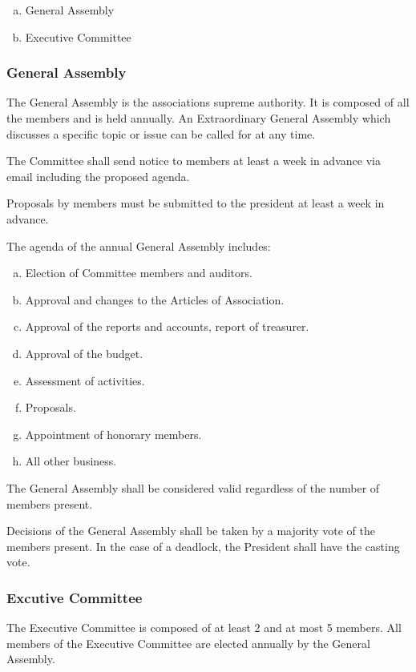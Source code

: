 \documentclass[12pt,a4paper,oneside]{article}
\newcounter{art}
\newcommand{\english}{    \switchcolumn[0]\noindent}
\begin{document}
\begin{paracol}{2}
	\begin{enumerate}[(a)]
	\item General Assembly
	\item Executive Committee
	\end{enumerate}


\english
	\subsubsection{General Assembly}
	The General Assembly is the associations supreme authority. It is composed of all the members and is held annually. An Extraordinary General Assembly which discusses a specific topic or issue can be called for at any time.

	The Committee shall send notice to members at least a week in advance via email including the proposed agenda.

	Proposals by members must be submitted to the president at least a week in advance.

	The agenda of the annual General Assembly includes:
	\begin{enumerate}[(a)]
	\item Election of Committee members and auditors.
	\item Approval and changes to the Articles of Association.
	\item Approval of the reports and accounts, report of treasurer.
	\item Approval of the budget.
	\item Assessment of activities.
	\item Proposals.
	\item Appointment of honorary members.
	\item All other business.
	\end{enumerate}

	The General Assembly shall be considered valid regardless of the number of members present.

	Decisions of the General Assembly shall be taken by a majority vote of the members present. In the case of a deadlock, the President shall have the casting vote.

	
\english
	\subsubsection{Excutive Committee}

	The Executive Committee is composed of at least 2 and at most 5 members. 
	All members of the Executive Committee are elected annually by the General Assembly.


\end{paracol}
\end{document}
